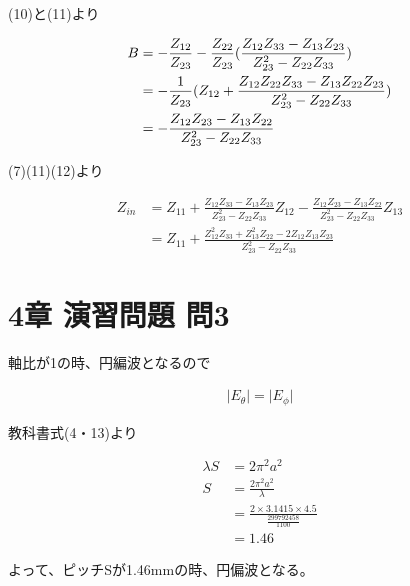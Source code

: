 \documentclass[dvipdfmx,autodetect-engine,titlepage]{jsarticle}
\begin{document}
(10)と(11)より

\begin{align}
  B &= -\frac{Z_{12}}{Z_{23}} - \frac{Z_{22}}{Z_{23}}(\frac{Z_{12}Z_{33} - Z_{13}Z_{23}}{Z_{23}^2 - Z_{22}Z_{33}})\notag\\
  &= -\frac{1}{Z_{23}}(Z_{12} + \frac{Z_{12}Z_{22}Z_{33} - Z_{13}Z_{22}Z_{23}}{Z_{23}^2 - Z_{22}Z_{33}})\notag\\
  &= -\frac{Z_{12}Z_{23} - Z_{13}Z_{22}}{Z_{23}^2 - Z_{22}Z_{33}}
\end{align}

(7)(11)(12)より

\begin{align*}
  Z_{in} &= Z_{11} + \frac{Z_{12}Z_{33}-Z_{13}Z_{23}}{Z_{23}^2-Z_{22}Z_{33}}Z_{12} - \frac{Z_{12}Z_{23} - Z_{13}Z_{22}}{Z_{23}^2 - Z_{22}Z_{33}}Z_{13}\\
  &= Z_{11} + \frac{Z_{12}^2Z_{33} + Z_{13}^2Z_{22} - 2Z_{12}Z_{13}Z_{23}}{Z_{23}^2-Z_{22}Z_{33}}
\end{align*}

\section{4章 演習問題 問3}

軸比が1の時、円編波となるので

\begin{align*}
  |E_{\theta} \vert = |E_{\phi} \vert
\end{align*}

教科書式(4・13)より

\begin{align*}
  \lambda S &= 2\pi^{2}a^2\\
  S &= \frac{2\pi^{2}a^2}{\lambda}\\
  &= \frac{2 \times 3.1415 \times 4.5}{\frac{299792458}{1100}}\\
  &= 1.46
\end{align*}

よって、ピッチSが1.46mmの時、円偏波となる。
\end{document}
